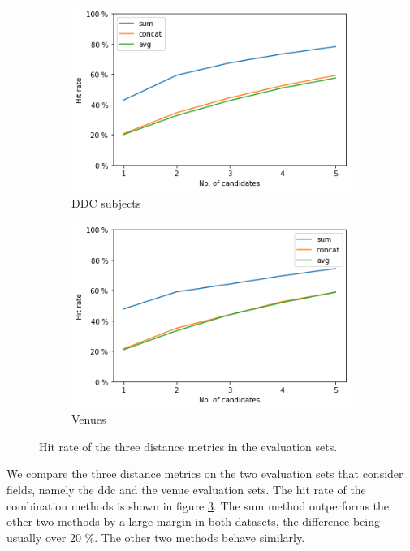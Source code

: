 \begin{figure}
  \begin{subfigure}[t]{.45\textwidth}
    \centering
    \includegraphics[width=\textwidth]{figures/unsupervised_approach/results/cosine_methods_ddc.png}
    \caption{DDC subjects}
    \label{fig:cosine_methods_ddc}
  \end{subfigure}
  \begin{subfigure}[t]{.45\textwidth}
    \centering
    \includegraphics[width=\textwidth]{figures/unsupervised_approach/results/cosine_methods_venues.png}
    \caption{Venues}
    \label{fig:cosine_methods_venues}
  \end{subfigure}
  \caption{Hit rate of the three distance metrics in the evaluation sets.}
  \label{fig:combination_eval}
\end{figure}

We compare the three distance metrics on the two evaluation sets that consider fields, namely the \acrshort{ddc} and the venue evaluation sets. The hit rate of the combination methods is shown in figure \ref{fig:combination_eval}. The sum method outperforms the other two methods by a large margin in both datasets, the difference being usually over 20 \%. The other two methods behave similarly.

